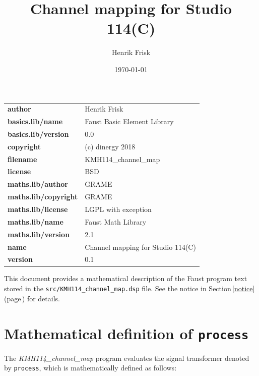 \documentclass{article}
\newcommand{\faustfilename}{src/KMH114\_channel\_map.dsp}
\newcommand{\faustprogname}{KMH114\_channel\_map}
\begin{document}
\title{Channel mapping for Studio 114(C)} \author{ Henrik Frisk } \date{\today} \maketitle \begin{tabular}{ll}  \hline  \textbf{author} &  Henrik Frisk  \\  \textbf{basics.lib/name} & Faust Basic Element Library \\  \textbf{basics.lib/version} & 0.0 \\  \textbf{copyright} & (c) dinergy 2018  \\  \textbf{filename} & KMH114\_channel\_map \\  \textbf{license} &  BSD  \\  \textbf{maths.lib/author} & GRAME \\  \textbf{maths.lib/copyright} & GRAME \\  \textbf{maths.lib/license} & LGPL with exception \\  \textbf{maths.lib/name} & Faust Math Library \\  \textbf{maths.lib/version} & 2.1 \\  \textbf{name} & Channel mapping for Studio 114(C) \\  \textbf{version} &  0.1  \\  \hline \end{tabular} \bigskip  \bigskip This document provides a mathematical description of the Faust program text stored in the \texttt{\faustfilename} file. See the notice in Section\,\ref{notice} (page\,\pageref{notice}) for details.   \section{Mathematical definition of \texttt{process}} \label{equation}  The \emph{\faustprogname} program evaluates the signal transformer denoted by \texttt{process}, which is mathematically defined as follows: 
\end{document}
